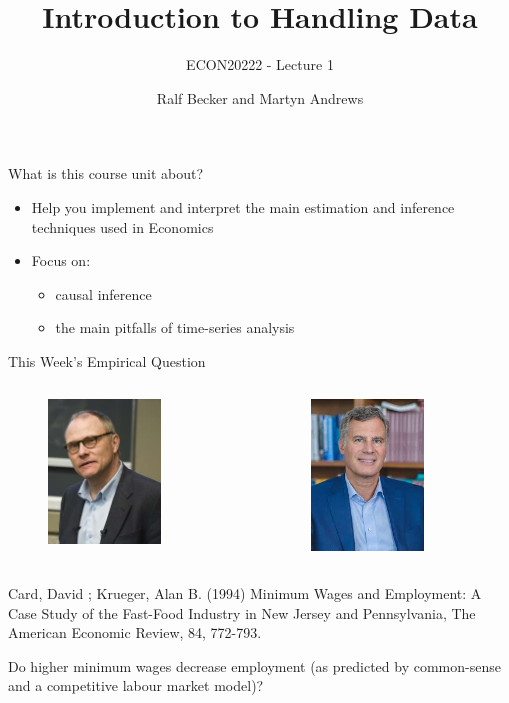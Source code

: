 \documentclass[
  ignorenonframetext,
]{beamer}
\title{Introduction to Handling Data}
\subtitle{ECON20222 - Lecture 1}
\author{Ralf Becker and Martyn Andrews}
\date{}
\begin{document}
\frame{\titlepage}

\begin{frame}{What is this course unit about?}
\label{what-is-this-course-unit-about}
\begin{itemize}
  \item Help you implement and interpret the main estimation and inference techniques used in Economics
  \item Focus on:
      \begin{itemize}
        \item causal inference
        \item the main pitfalls of time-series analysis
      \end{itemize}
\end{itemize}
\end{frame}

\begin{frame}{This Week's Empirical Question}
\label{this-weeks-empirical-question}
\begin{columns}
  
  \begin{column}{0.5\textwidth}
    \begin{figure}
        \centering
        \includegraphics[width=3cm]{david-card.jpg}\\
    \end{figure}

  \end{column}
  \begin{column}{0.5\textwidth}
    \begin{figure}
        \centering
        \includegraphics[width=3cm]{Krueger.jpeg}\\
    \end{figure}

  \end{column}
    
\end{columns}

Card, David ; Krueger, Alan B. (1994) Minimum Wages and Employment: A
Case Study of the Fast-Food Industry in New Jersey and Pennsylvania, The
American Economic Review, 84, 772-793.

Do higher minimum wages decrease employment (as predicted by
common-sense and a competitive labour market model)?
\end{frame}
\end{document}
